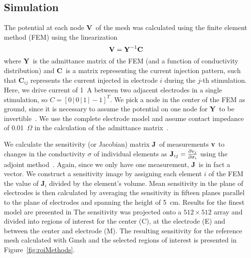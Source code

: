 \documentclass[12pt]{iopart}
\newcommand{\VB}{{\mbox{\bf V}}}
\newcommand{\YB}{{\mbox{\bf Y}}}
\newcommand{\CB}{{\mbox{\bf C}}}
\newcommand{\JB}{{\mbox{\bf J}}}
\newcommand{\vB}{{\mbox{\bf v}}}
\begin{document}
\subsection{Simulation}
The potential at each node \VB\ of the mesh was calculated using the finite
element method (FEM) using the linearization 
\begin{equation}
\VB = \YB^{-1}\CB
\end{equation}
where \YB\ is the admittance matrix of the FEM (and a function of conductivity
distribution) and \CB\ is a matrix representing the current injection pattern,
such that \CB$_{ij}$ represents the current injected in electrode $i$ during
the $j$-th stimulation. Here, we drive current of 1~A between two adjacent
electrodes in a single stimulation, so $C = [0\,|\,0\,|\,1\,|\,-1]^T$. 
We pick a node in the center of the FEM as ground, since it is necessary to
assume the potential on
one node for \YB\ to be invertible~\parencite{Adler1996a}.
We use the complete electrode model and assume contact impedance of
0.01~$\Omega$ in the calculation of the admittance
matrix~\parencite{polydorides_electrode_2002}. 


We calculate the sensitivity (or Jacobian) matrix \JB\ of measurements \vB\ to
changes in the conductivity $\sigma$ of individual elements as
$\JB_{ij}=\frac{\partial v_j}{\partial \sigma_i}$ using the adjoint
method~\parencite{polydorides_electrode_2002}. Again, since we only have one measurement, \JB\
is in fact a vector.
We construct a sensitivity image by assigning each element
$i$ of the FEM the value of \JB$_i$ divided by the element's volume.
Mean sensitivity in the plane of electrodes is then calculated by averaging
the sensitivity in fifteen planes parallel to the plane of electrodes and
spanning the height of 5~cm. Results for the finest model are presented in 
The sensitivity was projected onto a $512\times512$ array and divided into regions
of interest for the center (C), at the electrode (E) and between the center and electrode
(M). The resulting sensitivity for the reference mesh calculated with Gmsh and the 
selected regions of interest is presented in Figure~\ref{fig:roiMethods}.
\end{document}
